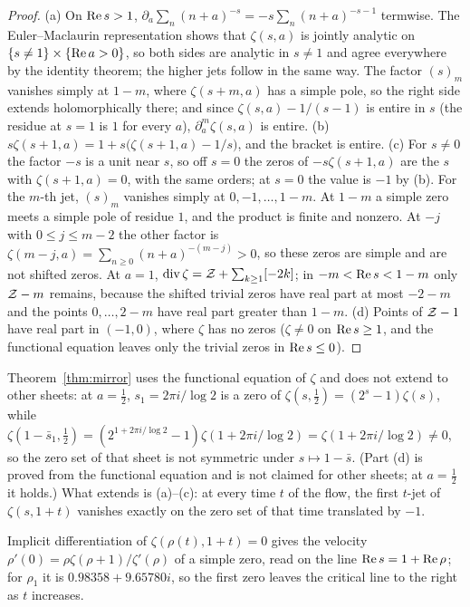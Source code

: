 \begin{proof}
(a) On $\operatorname{Re} s>1$, $\partial_a\sum_n(n+a)^{-s}=-s\sum_n(n+a)^{-s-1}$ termwise. The Euler--Maclaurin representation shows that $\zeta(s,a)$ is jointly analytic on $\{s\ne1\}\times\{\operatorname{Re} a>0\}$, so both sides are analytic in $s\ne1$ and agree everywhere by the identity theorem; the higher jets follow in the same way. The factor $(s)_m$ vanishes simply at $1-m$, where $\zeta(s+m,a)$ has a simple pole, so the right side extends holomorphically there; and since $\zeta(s,a)-1/(s-1)$ is entire in $s$ (the residue at $s=1$ is $1$ for every $a$), $\partial_a^m\zeta(s,a)$ is entire.
(b) $s\zeta(s+1,a)=1+s\big(\zeta(s+1,a)-1/s\big)$, and the bracket is entire.
(c) For $s\ne0$ the factor $-s$ is a unit near $s$, so off $s=0$ the zeros of $-s\zeta(s+1,a)$ are the $s$ with $\zeta(s+1,a)=0$, with the same orders; at $s=0$ the value is $-1$ by (b). For the $m$-th jet, $(s)_m$ vanishes simply at $0,-1,\dots,1-m$. At $1-m$ a simple zero meets a simple pole of residue $1$, and the product is finite and nonzero. At $-j$ with $0\le j\le m-2$ the other factor is $\zeta(m-j,a)=\sum_{n\ge0}(n+a)^{-(m-j)}>0$, so these zeros are simple and are not shifted zeros. At $a=1$, $\operatorname{div}\zeta=\mathcal{Z}+\sum_{k\ge1}[-2k]$; in $-m<\operatorname{Re} s<1-m$ only $\mathcal{Z}-m$ remains, because the shifted trivial zeros have real part at most $-2-m$ and the points $0,\dots,2-m$ have real part greater than $1-m$.
(d) Points of $\mathcal{Z}-1$ have real part in $(-1,0)$, where $\zeta$ has no zeros ($\zeta\ne0$ on $\operatorname{Re} s\ge1$, and the functional equation leaves only the trivial zeros in $\operatorname{Re} s\le0$).
\end{proof}

Theorem~\ref{thm:mirror} uses the functional equation of $\zeta$ and does not extend to other sheets: at $a=\tfrac12$, $s_1=2\pi i/\log2$ is a zero of $\zeta(s,\tfrac12)=(2^s-1)\zeta(s)$, while $\zeta(1-\bar s_1,\tfrac12)=(2^{1+2\pi i/\log2}-1)\zeta(1+2\pi i/\log2)=\zeta(1+2\pi i/\log2)\ne0$, so the zero set of that sheet is not symmetric under $s\mapsto1-\bar s$. (Part (d) is proved from the functional equation and is not claimed for other sheets; at $a=\tfrac12$ it holds.) What extends is (a)--(c): at every time $t$ of the flow, the first $t$-jet of $\zeta(s,1+t)$ vanishes exactly on the zero set of that time translated by $-1$.

Implicit differentiation of $\zeta(\rho(t),1+t)=0$ gives the velocity $\rho'(0)=\rho\zeta(\rho+1)/\zeta'(\rho)$ of a simple zero, read on the line $\operatorname{Re} s=1+\operatorname{Re}\rho$; for $\rho_1$ it is $0.98358+9.65780i$, so the first zero leaves the critical line to the right as $t$ increases.

